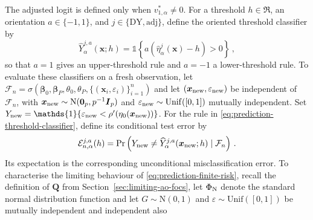 \documentclass{article}
\theoremstyle{definition}
\newcommand*{\bb}{\boldsymbol}
\newcommand{\betady}{\ensuremath{\hat{\bbeta}^{\textrm{\tiny DY}}}}
\newcommand{\thetady}{\ensuremath{\hat{\theta}^{\textrm{\tiny DY}}}}
\def\bx{\bb{x}}
\def\bbeta{\bb{\beta}}
\begin{document}
\begin{bibunit}
The adjusted logit is defined only when $v_{1,\alpha}^*\neq0$. For a
threshold $h\in\Re$, an orientation $a\in\{-1,1\}$, and
$j\in\{\mathrm{DY},\mathrm{adj}\}$, define the oriented threshold
classifier by
\begin{equation}
\label{eq:prediction-threshold-classifier}
    \widehat Y_\alpha^{j,a}(\bx;h)
    =
    \mathds{1}\left\{
        a\left(\hat\eta_\alpha^j(\bx)-h\right)>0
    \right\} \,,
\end{equation}
so that $a=1$ gives an upper-threshold rule and $a=-1$ a lower-threshold
rule.
To evaluate these classifiers on a fresh observation, let
$
    \mathcal F_n
    =
    \sigma(
        \bbeta_0,\bbeta_P,\theta_0,\theta_P,
        \{(\bx_i,\varepsilon_i)\}_{i=1}^n
    )
$
and let $(\bx_{\rm new},\varepsilon_{\rm new})$ be independent of
$\mathcal F_n$, with
$\bx_{\rm new}\sim\mathrm N(\bb0_p,p^{-1}\bb I_p)$ and
$\varepsilon_{\rm new}\sim\mathrm{Unif}([0,1])$ mutually independent. Set
$
    Y_{\rm new}
    =
    \mathds{1}\{
        \varepsilon_{\rm new}
        <
        \rho'(\eta_0(\bx_{\rm new}))
    \}
$.
For the rule in \eqref{eq:prediction-threshold-classifier}, define its
conditional test error by
\begin{equation}
\label{eq:prediction-finite-risk}
    \mathcal E_{n,\alpha}^{j,a}(h)
    =
    \Pr\left(
        Y_{\rm new}
        \neq
        \widehat Y_\alpha^{j,a}(\bx_{\rm new};h)
        \mid
        \mathcal F_n
    \right) \,.
\end{equation}
Its expectation is the corresponding unconditional misclassification error.
To characterise the limiting behaviour of
\eqref{eq:prediction-finite-risk}, recall the definition of $\bb Q$ from
Section~\ref{sec:limiting-ao-focs}, let $\Phi_{\rm N}$ denote the
standard normal distribution function and let $G\sim\mathrm N(0,1)$ and
$\varepsilon\sim\mathrm{Unif}([0,1])$ be mutually independent and independent also

\end{bibunit}
\end{document}
